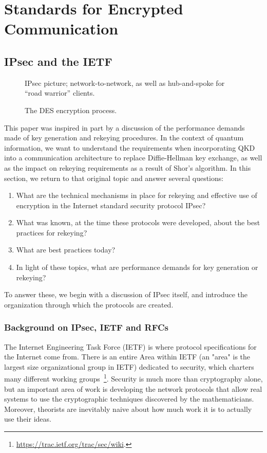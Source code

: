 \section{Standards for Encrypted Communication}

\subsection{IPsec and the IETF}
\label{sec:ipsec}
\begin{figure}
  {\color{Magenta} IPsec picture; network-to-network, as well as hub-and-spoke for ``road warrior'' clients.}
  \caption{The DES encryption process.}
  \label{fig:ipsec}
\end{figure}

This paper was inspired in part by a discussion of the performance
demands made of key generation and rekeying procedures.  In the
context of quantum information, we want to understand the requirements
when incorporating QKD into a communication architecture to replace
Diffie-Hellman key exchange, as well as the impact on rekeying
requirements as a result of Shor's algorithm.  In this section, we
return to that original topic and answer several questions:

\begin{enumerate}
\item What are the technical mechanisms in place for rekeying and
   effective use of encryption in the Internet standard security
   protocol IPsec?
\item What was known, at the time these protocols were developed, about
   the best practices for rekeying?
 \item What are best practices today?
   \item In light of these topics, what are performance demands for
     key generation or rekeying?
\end{enumerate}

To answer these, we begin with a discussion of IPsec itself, and
introduce the organization through which the protocols are created.

\subsubsection{Background on IPsec, IETF and RFCs}

The Internet Engineering Task Force (IETF) is where protocol
specifications for the Internet come from.  There is an entire Area
within IETF (an "area" is the largest size organizational group in
IETF) dedicated to security, which charters many different working
groups~\footnote{\url{https://trac.ietf.org/trac/sec/wiki}.}.
Security is much more than cryptography alone, but an important area
of work is developing the network protocols that allow real systems to
use the cryptographic techniques discovered by the mathematicians.
Moreover, theorists are inevitably naive about how much work it is to
actually use their ideas.

